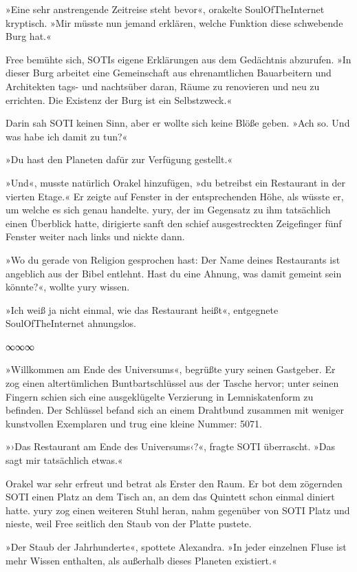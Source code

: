 »Eine sehr anstrengende Zeitreise steht bevor«, orakelte SoulOfTheInternet kryptisch. »Mir müsste nun jemand erklären, welche Funktion diese schwebende Burg hat.«

Free bemühte sich, SOTIs eigene Erklärungen aus dem Gedächtnis abzurufen. »In dieser Burg arbeitet eine Gemeinschaft aus ehrenamtlichen Bauarbeitern und Architekten tags- und nachtsüber daran, Räume zu renovieren und neu zu errichten. Die Existenz der Burg ist ein Selbstzweck.«

Darin sah SOTI keinen Sinn, aber er wollte sich keine Blöße geben. »Ach so. Und was habe ich damit zu tun?«

»Du hast den Planeten dafür zur Verfügung gestellt.«

»Und«, musste natürlich Orakel hinzufügen, »du betreibst ein Restaurant in der vierten Etage.« Er zeigte auf Fenster in der entsprechenden Höhe, als wüsste er, um welche es sich genau handelte. yury, der im Gegensatz zu ihm tatsächlich einen Überblick hatte, dirigierte sanft den schief ausgestreckten Zeigefinger fünf Fenster weiter nach links und nickte dann.

»Wo du gerade von Religion gesprochen hast: Der Name deines Restaurants ist angeblich aus der Bibel entlehnt. Hast du eine Ahnung, was damit gemeint sein könnte?«, wollte yury wissen.

»Ich weiß ja nicht einmal, wie das Restaurant heißt«, entgegnete SoulOfTheInternet ahnungslos.

\begin{center}
∞∞∞
\end{center}

»Willkommen am Ende des Universums«, begrüßte yury seinen Gastgeber. Er zog einen altertümlichen Buntbartschlüssel aus der Tasche hervor; unter seinen Fingern schien sich eine ausgeklügelte Verzierung in Lemniskatenform zu befinden. Der Schlüssel befand sich an einem Drahtbund zusammen mit weniger kunstvollen Exemplaren und trug eine kleine Nummer: 5071.

»›Das Restaurant am Ende des Universums‹?«, fragte SOTI überrascht. »Das sagt mir tatsächlich etwas.«

Orakel war sehr erfreut und betrat als Erster den Raum. Er bot dem zögernden SOTI einen Platz an dem Tisch an, an dem das Quintett schon einmal diniert hatte. yury zog einen weiteren Stuhl heran, nahm gegenüber von SOTI Platz und nieste, weil Free seitlich den Staub von der Platte pustete.

»Der Staub der Jahrhunderte«, spottete Alexandra. »In jeder einzelnen Fluse ist mehr Wissen enthalten, als außerhalb dieses Planeten existiert.«

